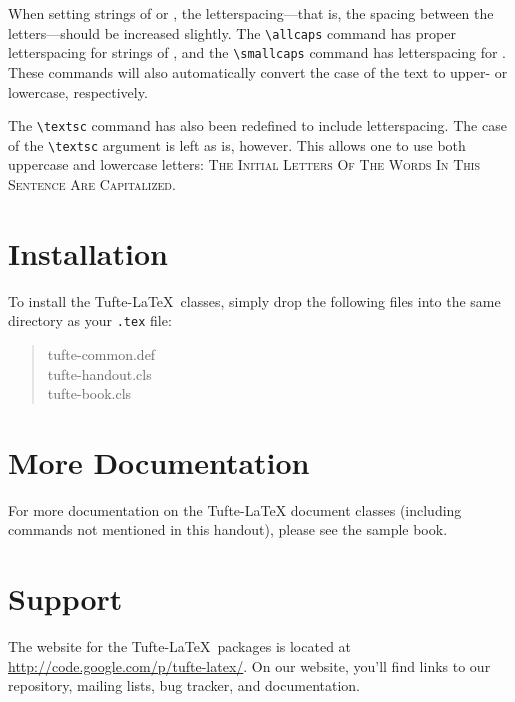 \documentclass{tufte-handout}
\begin{document}
When setting strings of  or , the
letter\-spacing---that is, the spacing between the letters---should be
increased slightly.\cite{Bringhurst2005}  The \Verb|\allcaps| command has proper letterspacing for
strings of , and the \Verb|\smallcaps| command
has letterspacing for .  These commands
will also automatically convert the case of the text to upper- or
lowercase, respectively.

The \Verb|\textsc| command has also been redefined to include
letterspacing.  The case of the \Verb|\textsc| argument is left as is,
however.  This allows one to use both uppercase and lowercase letters:
\textsc{The Initial Letters Of The Words In This Sentence Are Capitalized.}



\section{Installation}\label{sec:installation}
To install the Tufte-\LaTeX\ classes, simply drop the
following files into the same directory as your \texttt{.tex}
file:
\begin{quote}
  \ttfamily
  tufte-common.def\\
  tufte-handout.cls\\
  tufte-book.cls
\end{quote}




\section{More Documentation}\label{sec:more-doc}
For more documentation on the Tufte-\LaTeX{} document classes (including commands not
mentioned in this handout), please see the sample book.

\section{Support}\label{sec:support}

The website for the Tufte-\LaTeX\ packages is located at
\url{http://code.google.com/p/tufte-latex/}.  On our website, you'll find
links to our  repository, mailing lists, bug tracker, and documentation.



\end{document}
